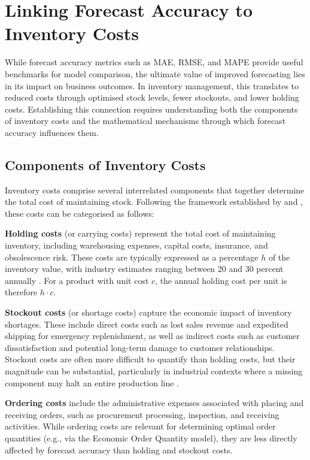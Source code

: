 \documentclass[ENG]{TFUOC}%
\begin{document}
\section{Linking Forecast Accuracy to Inventory Costs}

While forecast accuracy metrics such as MAE, RMSE, and MAPE provide useful benchmarks for model comparison, the ultimate value of improved forecasting lies in its impact on business outcomes. In inventory management, this translates to reduced costs through optimised stock levels, fewer stockouts, and lower holding costs. Establishing this connection requires understanding both the components of inventory costs and the mathematical mechanisms through which forecast accuracy influences them.

\subsection{Components of Inventory Costs}

Inventory costs comprise several interrelated components that together determine the total cost of maintaining stock. Following the framework established by \citet{silver2016inventory} and \citet{chopra2021supply}, these costs can be categorised as follows:

\textbf{Holding costs} (or carrying costs) represent the total cost of maintaining inventory, including warehousing expenses, capital costs, insurance, and obsolescence risk. These costs are typically expressed as a percentage $h$ of the inventory value, with industry estimates ranging between 20 and 30 percent annually \citep{silver2016inventory}. For a product with unit cost $c$, the annual holding cost per unit is therefore $h \cdot c$.

\textbf{Stockout costs} (or shortage costs) capture the economic impact of inventory shortages. These include direct costs such as lost sales revenue and expedited shipping for emergency replenishment, as well as indirect costs such as customer dissatisfaction and potential long-term damage to customer relationships. Stockout costs are often more difficult to quantify than holding costs, but their magnitude can be substantial, particularly in industrial contexts where a missing component may halt an entire production line \citep{chopra2021supply}.

\textbf{Ordering costs} include the administrative expenses associated with placing and receiving orders, such as procurement processing, inspection, and receiving activities. While ordering costs are relevant for determining optimal order quantities (e.g., via the Economic Order Quantity model), they are less directly affected by forecast accuracy than holding and stockout costs.
\end{document}
